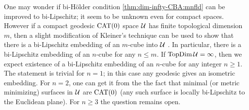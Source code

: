 One may wonder if bi-H\"older condition \ref{thm:dim-infty-CBA:mnfld} can be improved to bi-Lipschitz;
it seem to be unknown even for compact spaces.
However if a compact geodesic $\mathrm{CAT}(0)$ space $\mathcal{U}$ has finite topological dimension $m$,
then a slight modification of Kleiner's technique can be used to show that there is a bi-Lipschitz embedding of an $m$-cube into $\mathcal{U}$ \cite[Theorem 14.15]{alexander-kapovitch-petrunin-2025}.
In particular, there is a bi-Lipschitz embedding of an $n$-cube for any $n\le m$.
If $\mathop{\rm TopDim}\nolimits\mathcal{U}=\infty$, then we expect existence of a bi-Lipschitz embedding of an $n$-cube for any integer $n\ge1$.
The statement is trivial for $n=1$; in this case any geodesic gives an isometric embedding.
For $n=2$, one can get it from the the fact that minimal (or metric minimizing) surfaces in $\mathcal{U}$ are $\mathrm{CAT}(0)$ (any such surface is locally bi-Lipschitz to the Euclidean plane).
For $n\ge 3$ the question remains open.


